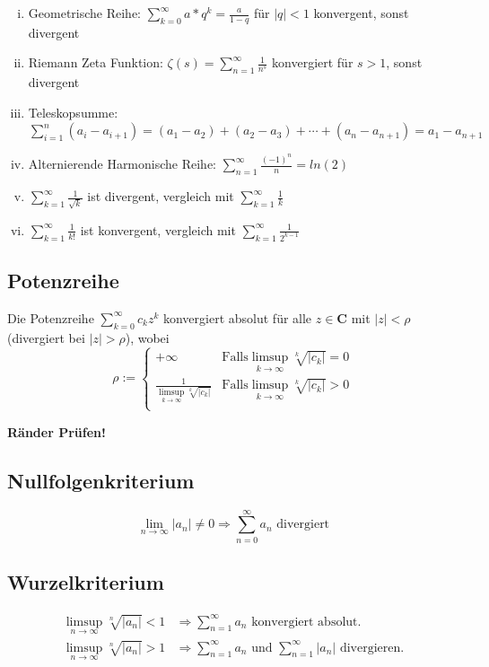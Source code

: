\documentclass[8pt]{article}
\begin{document}
\begin{multicols*}{3}
\begin{enumerate}[(i)]
  \item Geometrische Reihe: $\sum_{k = 0}^\infty a * q^k = \frac{a}{1 - q}$ für $|q| < 1$ konvergent, sonst divergent
  \item Riemann Zeta Funktion: $\zeta(s) = \sum_{n = 1}^\infty \frac{1}{n^s}$ konvergiert für $s > 1$, sonst divergent
  \item Teleskopsumme: $\sum_{i = 1}^n (a_i - a_{i + 1}) = (a_1 - a_2) + (a_2 - a_3) + \cdots +(a_n - a_{n+1}) = a_1 - a_{n+1}$ 
  \item Alternierende Harmonische Reihe: $\sum_{n = 1}^\infty \frac{(-1)^n}{n} = ln(2)$
  \item $\sum_{k = 1}^\infty \frac{1}{\sqrt{k}}$ ist divergent, vergleich mit $\sum_{k = 1}^\infty \frac{1}{k}$
  \item $\sum_{k = 1}^\infty \frac{1}{k!}$ ist konvergent, vergleich mit $\sum_{k = 1}^\infty \frac{1}{2^{k-1}}$
\end{enumerate}
\subsection {Potenzreihe}
Die Potenzreihe $\sum_{k = 0}^\infty c_k z^k$ konvergiert absolut für alle $z \in \mathbf{C}$
mit $|z| < \rho$ (divergiert bei $|z| > \rho$), wobei
$$
  \rho := \begin{cases}
    +\infty &\text{Falls} \limsup_{k \rightarrow \infty} \sqrt[k]{|c_k|} = 0\\
    \frac{1}{\limsup_{k \rightarrow \infty} \sqrt[k]{|c_k|}} &\text{Falls} \limsup_{k \rightarrow \infty} \sqrt[k]{|c_k|} > 0\\
  \end{cases}
$$
\begin{center}
  \color{red}
  \textbf{Ränder Prüfen!}
\end{center}
\subsection{Nullfolgenkriterium}
$$
  \lim_{n \rightarrow \infty} |a_n| \neq 0 \Rightarrow \sum_{n = 0}^\infty a_n \text{ divergiert}
$$

\subsection{Wurzelkriterium}

\begin{align*}
  \limsup_{n \rightarrow \infty} \sqrt[n]{|a_n|} < 1 &\Rightarrow \sum_{n = 1}^\infty a_n \text{ konvergiert absolut.}\\
  \limsup_{n \rightarrow \infty} \sqrt[n]{|a_n|} > 1 &\Rightarrow \sum_{n = 1}^\infty a_n \text{ und } \sum_{n = 1}^\infty |a_n| \text{ divergieren.}
\end{align*}


\end{multicols*}
\end{document}
